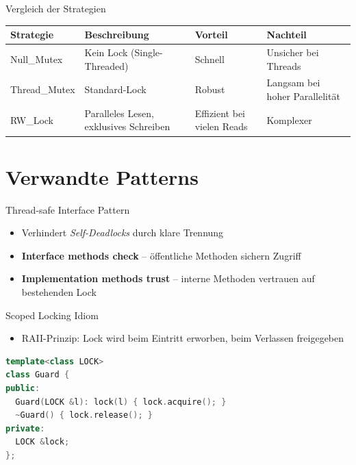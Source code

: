 \documentclass[aspectratio=169,10pt]{beamer}
\begin{document}
\begin{frame}{Vergleich der Strategien}
  \begin{tabular}{|l|l|l|l|}
  \hline
    \textbf{Strategie} & \textbf{Beschreibung} & \textbf{Vorteil} & \textbf{Nachteil} \\
  \hline
  Null\_Mutex & Kein Lock (Single-Threaded) & Schnell & Unsicher bei Threads \\
  Thread\_Mutex & Standard-Lock & Robust & Langsam bei hoher Parallelit\"at \\
  RW\_Lock & Paralleles Lesen, exklusives Schreiben & Effizient bei vielen Reads & Komplexer \\
  \hline
  \end{tabular}
\end{frame}

\section{Verwandte Patterns}
\begin{frame}{Thread-safe Interface Pattern}
  \begin{itemize}
    \item Verhindert \textit{Self-Deadlocks} durch klare Trennung
    \item \textbf{Interface methods check} -- \"offentliche Methoden sichern Zugriff
    \item \textbf{Implementation methods trust} -- interne Methoden vertrauen auf bestehenden Lock
  \end{itemize}
\end{frame}

\begin{frame}[fragile]{Scoped Locking Idiom}
  \begin{itemize}
    \item RAII-Prinzip: Lock wird beim Eintritt erworben, beim Verlassen freigegeben
  \end{itemize}
  \vspace{1em}
  \begin{lstlisting}[language=C++]
template<class LOCK>
class Guard {
public:
  Guard(LOCK &l): lock(l) { lock.acquire(); }
  ~Guard() { lock.release(); }
private:
  LOCK &lock;
};
  \end{lstlisting}
\end{frame}

\end{document}
